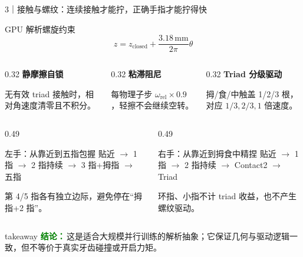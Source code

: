 \documentclass[aspectratio=169,10pt]{ctexbeamer}
\newcommand{\takeaway}[1]{%
  \begin{beamercolorbox}[wd=\textwidth,rounded=true,sep=0.55ex]{takeaway}
    \footnotesize\textcolor{Green}{\bfseries 结论：}\,#1
  \end{beamercolorbox}}
\begin{document}
\begin{frame}[t]{3｜接触与螺纹：连续接触才能拧，正确手指才能拧得快}
  \begin{block}{GPU 解析螺旋约束}
    \[
      z=z_{\mathrm{closed}}+\frac{3.18\,\mathrm{mm}}{2\pi}\theta
    \]
    \begin{columns}[T,onlytextwidth]
      \begin{column}{0.32\textwidth}
        \textbf{静摩擦自锁}\par
        无有效 triad 接触时，相对角速度清零且不积分。
      \end{column}
      \begin{column}{0.32\textwidth}
        \textbf{粘滞阻尼}\par
        每物理子步 $\omega_{\mathrm{rel}}\!\times\!0.9$，轻擦不会继续空转。
      \end{column}
      \begin{column}{0.32\textwidth}
        \textbf{Triad 分级驱动}\par
        拇/食/中触盖 1/2/3 根，对应 $1/3,2/3,1$ 倍速度。
      \end{column}
    \end{columns}
  \end{block}

  \begin{columns}[T,onlytextwidth]
    \begin{column}{0.49\textwidth}
      \begin{block}{左手：从靠近到五指包握}
        \centering\scriptsize
        贴近 $\rightarrow$ 1 指 $\rightarrow$ 2 指持续
        $\rightarrow$ 3 指+拇指 $\rightarrow$ 五指
        \par\vspace{0.35em}\raggedright
        第 4/5 指各有独立边际，避免停在“拇指+2 指”。
      \end{block}
    \end{column}
    \begin{column}{0.49\textwidth}
      \begin{block}{右手：从靠近到拇食中精捏}
        \centering\scriptsize
        贴近 $\rightarrow$ 1 指 $\rightarrow$ 2 指持续
        $\rightarrow$ Contact2 $\rightarrow$ Triad
        \par\vspace{0.35em}\raggedright
        环指、小指不计 triad 收益，也不产生螺纹驱动。
      \end{block}
    \end{column}
  \end{columns}

  \takeaway{这是适合大规模并行训练的解析抽象；它保证几何与驱动逻辑一致，但不等价于真实牙齿碰撞或开启力矩。}
\end{frame}
\end{document}
